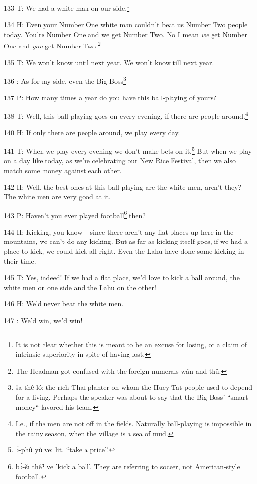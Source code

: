 133 T: We had a white man on our side.\footnote{It is not clear whether this is meant to be an excuse for losing, or a claim of intrinsic superiority in spite of having lost.}

134 H: Even your Number One white man couldn't beat us Number Two people today.
You're Number One and we get Number Two. No I mean \textit{we} get Number One and
\textit{you} get Number Two.\footnote{The Headman got confused with the foreign numerals wân and thû.}

135 T: We won't know until next year. We won't know till next year.

136 : As for my side, even the Big Boss\footnote{ša-thê ló: the rich Thai planter on whom the Huey Tat people used to depend for a living. Perhaps the speaker was about to say that the Big Boss' ``smart money`` favored his team.} --

137 P: How many times a year do you have this ball-playing of yours?

138 T: Well, this ball-playing goes on every evening, if there are people around.\footnote{I.e., if the men are not off in the fields. Naturally ball-playing is impossible in the rainy season, when the village is a sea of mud.}

140 H: If only there are people around, we play every day.

141 T: When we play every evening we don't make bets on it.\footnote{ɔ̀-phû yù ve: lit. ``take a price''.} But when we play
on a day like today, as we're celebrating our New Rice Festival, then we also match
some money against each other.

142 H: Well, the best ones at this ball-playing are the white men, aren't they?
The white men are very good at it.

143 P: Haven't you ever played football\footnote{bɔ́-šī thêʔ ve 'kick a ball'. They are referring to soccer, not American-style football.} then?

144 H: Kicking, you know -- since there aren't any flat places up here in the mountains,
we can't do any kicking. But as far as kicking itself goes, if we had a place to
kick, we could kick all right. Even the Lahu have done some kicking in their time.

145 T: Yes, indeed! If we had a flat place, we'd love to kick a ball around, the
white men on one side and the Lahu on the other!

146 H: We'd never beat the white men.

147 : We'd win, we'd win!


